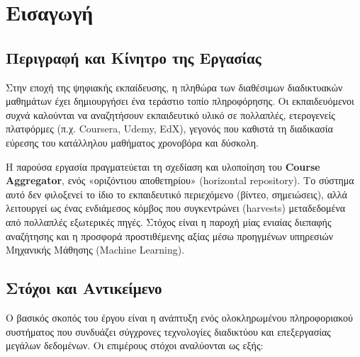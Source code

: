 \documentclass[a4paper,12pt]{article}
\begin{document}

\newpage

\tableofcontents
\newpage

\section{Εισαγωγή}
\subsection{Περιγραφή και Κίνητρο της Εργασίας}
Στην εποχή της ψηφιακής εκπαίδευσης, η πληθώρα των διαθέσιμων διαδικτυακών μαθημάτων έχει δημιουργήσει ένα τεράστιο τοπίο πληροφόρησης. Οι εκπαιδευόμενοι συχνά καλούνται να αναζητήσουν εκπαιδευτικό υλικό σε πολλαπλές, ετερογενείς πλατφόρμες (π.χ. Coursera, Udemy, EdX), γεγονός που καθιστά τη διαδικασία εύρεσης του κατάλληλου μαθήματος χρονοβόρα και δύσκολη.

Η παρούσα εργασία πραγματεύεται τη σχεδίαση και υλοποίηση του \textbf{ Course Aggregator}, ενός «οριζόντιου αποθετηρίου» (horizontal repository). Το σύστημα αυτό δεν φιλοξενεί το ίδιο το εκπαιδευτικό περιεχόμενο (βίντεο, σημειώσεις), αλλά λειτουργεί ως ένας ενδιάμεσος κόμβος που συγκεντρώνει (harvests) μεταδεδομένα από πολλαπλές εξωτερικές πηγές. Στόχος είναι η παροχή μίας ενιαίας διεπαφής αναζήτησης και η προσφορά προστιθέμενης αξίας μέσω προηγμένων υπηρεσιών Μηχανικής Μάθησης (Machine Learning).

\subsection{Στόχοι και Αντικείμενο}
Ο βασικός σκοπός του έργου είναι η ανάπτυξη ενός ολοκληρωμένου πληροφοριακού συστήματος που συνδυάζει σύγχρονες τεχνολογίες διαδικτύου και επεξεργασίας μεγάλων δεδομένων. Οι επιμέρους στόχοι αναλύονται ως εξής:
\end{document}
